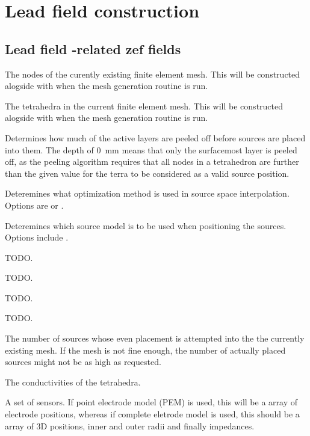 \section{Lead field construction}\label{sec:lead-field-construction}

\subsection{Lead field -related zef fields}\label{ssec:meshing-fields}

 The nodes of the curently existing finite element mesh.
This will be constructed alogside with  when the mesh
generation routine is run.

 The tetrahedra in the current finite element mesh. This
will be constructed alogside with  when the mesh generation
routine is run.

 Determines how much of the active
layers are peeled off before sources are placed into them. The depth of
\SI{0}{\milli\meter} means that only the surfacemost layer is peeled off, as
the peeling algorithm requires that all nodes in a tetrahedron are further
than the given value for the terra to be considered as a valid source
position.

 Deteremines what optimization
method is used in source space interpolation. Options are  or
.

 Deteremines which source model is to be used
when positioning the sources. Options include .

 TODO.

 TODO.

 TODO.

 TODO.

 The number of sources whose even placement is
attempted into the the currently existing mesh. If the mesh is not fine
enough, the number of actually placed sources might not be as high as
requested.

 The conductivities of the tetrahedra.

 A set of sensors. If point electrode model (PEM) is
used, this will be a  array of electrode positions, whereas if
complete eletrode model is used, this should be a  array of 3D
positions, inner and outer radii and finally impedances.

